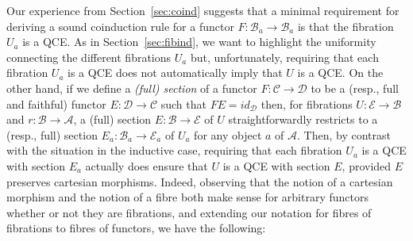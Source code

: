 \documentclass{LMCS}
\newcommand{\ra}{\rightarrow}
\newcommand{\mcal}[1]{\mathcal{#1}}
\newcommand{\C}{\mcal{C}}
\newcommand\E{{\mathcal E}}
\newcommand\B{{\mathcal B}}
\newcommand\A{{\mathcal A}}
\newcommand\D{{\mathcal D}}
\theoremstyle{plain}
\theoremstyle{remark}
\theoremstyle{definition}
\begin{document}
Our experience from Section~\ref{sec:coind} suggests that a minimal
requirement for deriving a sound coinduction rule for a functor
$F:\B_a \ra \B_a$ is that the fibration $U_a$ is a QCE.  As in
Section~\ref{sec:fibind}, we want to highlight the uniformity
connecting the different fibrations $U_a$ but, unfortunately,
requiring that each fibration $U_a$ is a QCE does not automatically
imply that $U$ is a QCE. On the other hand, if we define a
\emph{(full) section} of a functor $F:\C\to\D$ to be a (resp., full
and faithful) functor $E:\D \ra \C$ such that $FE=id_\D$ then, for
fibrations $U:\E\to\B$ and $r:\B\to\A$, a (full) section $E:\B\to\E$
of $U$ straightforwardly restricts to a (resp., full) section
$E_a:\B_a\to\E_a$ of $U_a$ for any object $a$ of $\A$. Then, by
contrast with the situation in the inductive case, requiring that each
fibration $U_a$ is a QCE with section $E_a$ actually does ensure that
$U$ is a QCE with section $E$, provided $E$ preserves cartesian
morphisms. Indeed, observing that the notion of a cartesian morphism
and the notion of a fibre both make sense for arbitrary functors
whether or not they are fibrations, and extending our notation for
fibres of fibrations to fibres of functors, we have the following:
\end{document}
